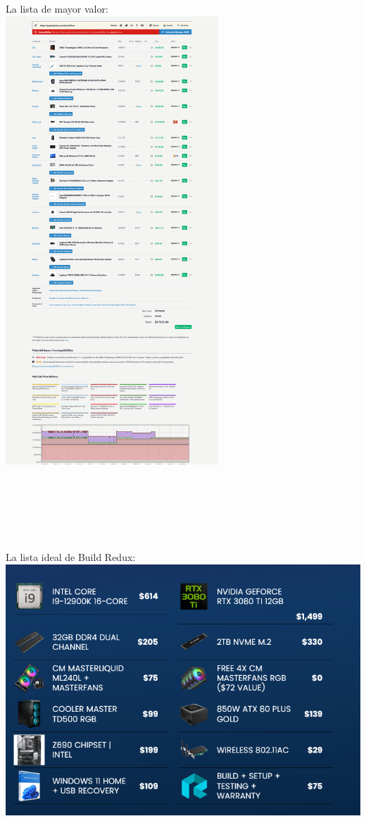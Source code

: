 \documentclass[12pt, a4paper]{article}
\begin{document}
La lista de mayor valor: \\
\includegraphics[width=0.6\textwidth]{Maximum.png} \\ \\ \\ \\ \\ \\ \\
La lista ideal de Build Redux: \\
\includegraphics[width=1.2\textwidth]{BuildReduxIdeal.png} \newpage
\end{document}
